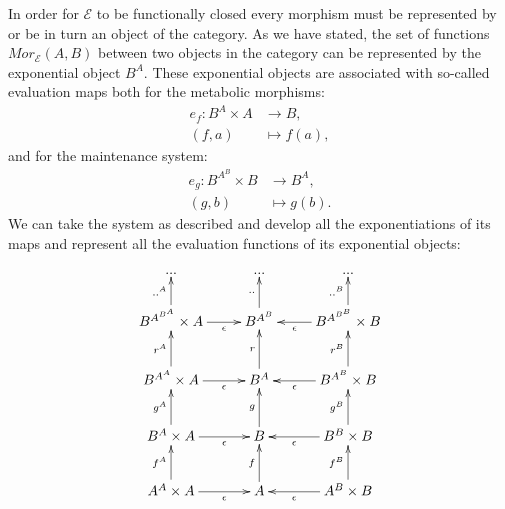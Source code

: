 In order for  $\mathcal{E}$ to be functionally closed every morphism must be represented by or be in turn an object of the category. As we have stated, the set of functions $Mor_{\mathcal{E}}(A,B)$ between two objects in the category can be represented by the exponential object $B^A$. These exponential objects are associated with so-called evaluation maps both for the metabolic morphisms:
\begin{align*}
e_f : B^A \times A &\longrightarrow B,\\
(f,a) & \longmapsto f(a),
\end{align*}
and for the maintenance system:
\begin{align*}
			e_g: B^{A^B} \times B &\longrightarrow B^A,\\
	    			            (g,b) & \longmapsto    g(b).
\end{align*}		
We can take the system as described and develop all the exponentiations of its maps and represent all the evaluation functions of its exponential objects:		
$$
			\xymatrix{
			 ... & ... & ... \\
			  B^{A^{B^A}} \times A \ar[r]_-{\epsilon} \ar[u]^-{..^A} & B^{A^B} \ar[u]^-{..} & B^{A^{B^B}} \times B\ar[l]^-{\epsilon}\ar[u]^-{..^B} \\
			 B^{A^A} \times A \ar[r]_-{\epsilon} \ar[u]^-{r^A} & B^A \ar[u]^-{r} & B^{A^B} \times B\ar[l]^-{\epsilon}\ar[u]^-{r^B} \\
			B^A \times A \ar[r]_-{\epsilon} \ar[u]^-{g^A} & B \ar[u]^-{g} & B^B \times B\ar[l]^-{\epsilon}\ar[u]^-{g^B} \\
			A^A \times A \ar[r]_-{\epsilon} \ar[u]^-{f^A} & 
			A\ar[u]^-{f} & A^B\times B\ar[l]^-{\epsilon}\ar[u]^-{f^B} }
$$

